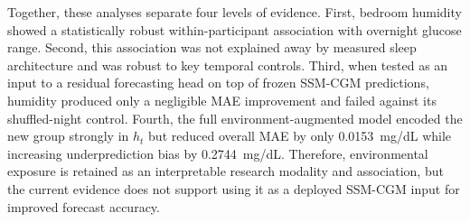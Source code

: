 Together, these analyses separate four levels of evidence. First, bedroom
humidity showed a statistically robust within-participant association with
overnight glucose range. Second, this association was not explained away by
measured sleep architecture and was robust to key temporal controls. Third,
when tested as an input to a residual forecasting head on top of frozen SSM-CGM
predictions, humidity produced only a negligible MAE improvement and failed
against its shuffled-night control. Fourth, the full environment-augmented
model encoded the new group strongly in $h_t$ but reduced overall MAE by only
0.0153~mg/dL while increasing underprediction bias by 0.2744~mg/dL.
Therefore, environmental exposure is retained as an interpretable research
modality and association, but the current evidence does not support using it
as a deployed SSM-CGM input for improved forecast accuracy.
